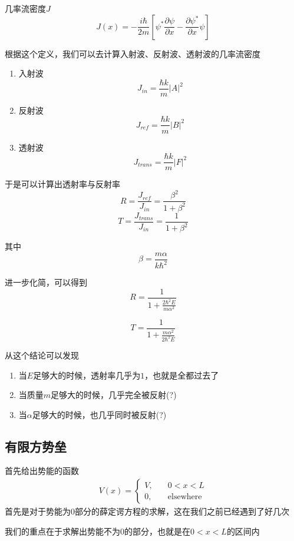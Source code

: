 \documentclass{article}
\begin{document}
几率流密度$J$
\[
	J(x)=-\frac{i\hbar}{2m}\left[\psi^{*}\frac{\partial\psi}{\partial x}-\frac{\partial \psi^{*}}{\partial x}\psi\right]
\]

根据这个定义，我们可以去计算入射波、反射波、透射波的几率流密度
\begin{center}
	\begin{enumerate}
		\item 入射波\[J_{in}=\frac{\hbar k}{m}\left|A\right|^2\]
		\item 反射波\[J_{ref}=\frac{\hbar k}{m}\left|B\right|^2\]
		\item 透射波\[J_{trans}=\frac{\hbar k}{m}\left|F\right|^2\]
	\end{enumerate}
\end{center}

于是可以计算出透射率与反射率
\[
	R=\frac{J_{ref}}{J_{in}}=\frac{\beta^2}{1+\beta^2}
\]
\[
	T=\frac{J_{trans}}{J_{in}}=\frac{1}{1+\beta^2}
\]

其中
\[\beta=\frac{m\alpha}{k\hbar^2}\]

进一步化简，可以得到
\[
	R=\frac{1}{1+\frac{2\hbar^2E}{m\alpha^2}}
\]

\[
	T=\frac{1}{1+\frac{m\alpha^2}{2\hbar^2E}}
\]

从这个结论可以发现
\begin{enumerate}
	\item 当$E$足够大的时候，透射率几乎为$1$，也就是全都过去了
	\item 当质量$m$足够大的时候，几乎完全被反射(?)
	\item 当$\alpha$足够大的时候，也几乎同时被反射(?)
\end{enumerate}



\subsection{有限方势垒}

首先给出势能的函数
\begin{align*}
	V(x)=
	\begin{cases}
		V, & \quad0<x<L            \\
		0, & \quad\text{elsewhere}
	\end{cases}
\end{align*}
首先是对于势能为$0$部分的薛定谔方程的求解，这在我们之前已经遇到了好几次



我们的重点在于求解出势能不为$0$的部分，也就是在$0<x<L$的区间内
\end{document}
